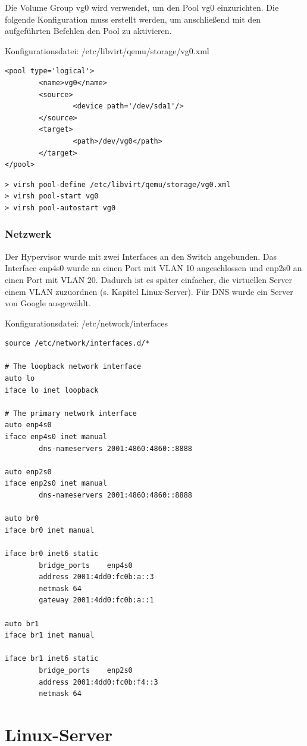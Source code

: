 Die Volume Group {\sc vg0} wird verwendet, um den Pool {\sc vg0} einzurichten. Die folgende Konfiguration muss erstellt werden, um anschließend mit den aufgeführten Befehlen den Pool zu aktivieren.       

Konfigurationsdatei: {\sc /etc/libvirt/qemu/storage/vg0.xml}
\begin{lstlisting}
<pool type='logical'>
        <name>vg0</name>
        <source>
                <device path='/dev/sda1'/>
        </source>
        <target>
                <path>/dev/vg0</path>
        </target>
</pool>
\end{lstlisting}
\begin{lstlisting}[numbers=none]
> virsh pool-define /etc/libvirt/qemu/storage/vg0.xml
> virsh pool-start vg0
> virsh pool-autostart vg0
\end{lstlisting}

\subsubsection{Netzwerk}

Der Hypervisor wurde mit zwei Interfaces an den Switch angebunden. Das Interface {\sc enp4s0} wurde an einen Port mit VLAN 10 angeschlossen und {\sc enp2s0} an einen Port mit VLAN 20. Dadurch ist es später einfacher, die virtuellen Server einem VLAN zuzuordnen (s. Kapitel \ql Linux-Server\qr). Für DNS wurde ein Server von Google ausgewählt.

Konfigurationsdatei: {\sc /etc/network/interfaces}
\begin{lstlisting}
source /etc/network/interfaces.d/*

# The loopback network interface
auto lo
iface lo inet loopback

# The primary network interface
auto enp4s0
iface enp4s0 inet manual
        dns-nameservers 2001:4860:4860::8888

auto enp2s0
iface enp2s0 inet manual
        dns-nameservers 2001:4860:4860::8888

auto br0
iface br0 inet manual

iface br0 inet6 static
        bridge_ports    enp4s0
        address 2001:4dd0:fc0b:a::3
        netmask 64
        gateway 2001:4dd0:fc0b:a::1

auto br1
iface br1 inet manual

iface br1 inet6 static
        bridge_ports    enp2s0
        address 2001:4dd0:fc0b:f4::3
        netmask 64
\end{lstlisting}\section{Linux-Server}

